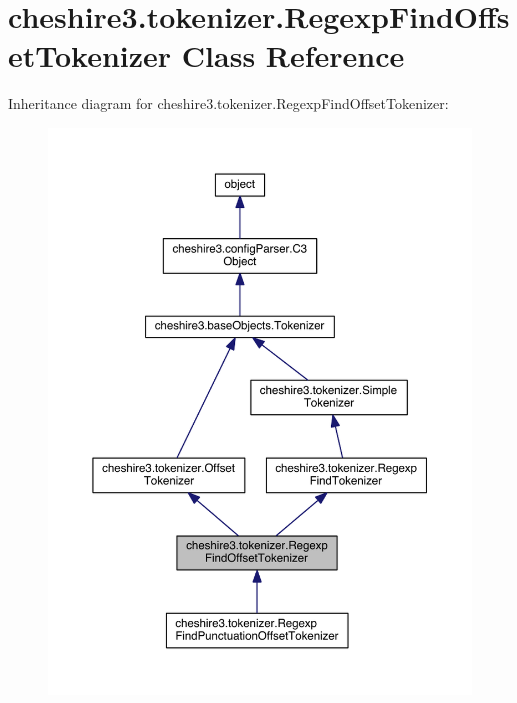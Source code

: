 \hypertarget{classcheshire3_1_1tokenizer_1_1_regexp_find_offset_tokenizer}{\section{cheshire3.\-tokenizer.\-Regexp\-Find\-Offset\-Tokenizer Class Reference}
\label{classcheshire3_1_1tokenizer_1_1_regexp_find_offset_tokenizer}
}


Inheritance diagram for cheshire3.\-tokenizer.\-Regexp\-Find\-Offset\-Tokenizer\-:
\nopagebreak
\begin{figure}[H]
\begin{center}
\leavevmode
\includegraphics[width=350pt]{classcheshire3_1_1tokenizer_1_1_regexp_find_offset_tokenizer__inherit__graph}
\end{center}
\end{figure}


